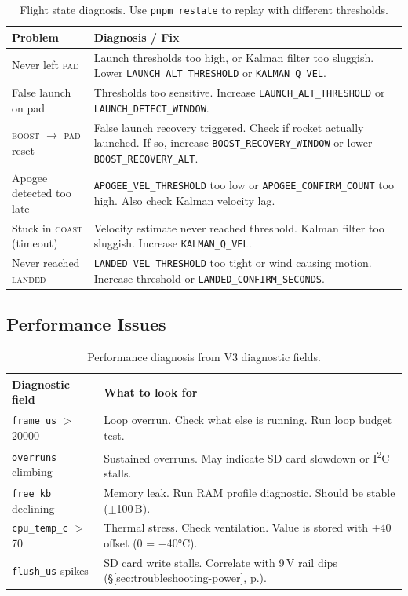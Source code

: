 \documentclass[11pt, a4paper, twoside]{article}
\newcommand{\config}[1]{\texttt{#1}}
\newcommand{\state}[1]{\textsc{#1}}
\newcommand{\xref}[1]{(\S\ref{#1}, p.\pageref{#1})}
\begin{document}
\begin{table}[ht]
\centering
\small
\caption{Flight state diagnosis. Use \texttt{pnpm restate} to replay with different thresholds.}
\label{tab:fsm-diag}
\begin{tabularx}{\textwidth}{l X}
\toprule
\textbf{Problem} & \textbf{Diagnosis / Fix} \\
\midrule
Never left \state{pad} & Launch thresholds too high, or Kalman filter too sluggish. Lower \config{LAUNCH\_ALT\_THRESHOLD} or \config{KALMAN\_Q\_VEL}. \\
False launch on pad & Thresholds too sensitive. Increase \config{LAUNCH\_ALT\_THRESHOLD} or \config{LAUNCH\_DETECT\_WINDOW}. \\
\state{boost} $\to$ \state{pad} reset & False launch recovery triggered. Check if rocket actually launched. If so, increase \config{BOOST\_RECOVERY\_WINDOW} or lower \config{BOOST\_RECOVERY\_ALT}. \\
Apogee detected too late & \config{APOGEE\_VEL\_THRESHOLD} too low or \config{APOGEE\_CONFIRM\_COUNT} too high. Also check Kalman velocity lag. \\
Stuck in \state{coast} (timeout) & Velocity estimate never reached threshold. Kalman filter too sluggish. Increase \config{KALMAN\_Q\_VEL}. \\
Never reached \state{landed} & \config{LANDED\_VEL\_THRESHOLD} too tight or wind causing motion. Increase threshold or \config{LANDED\_CONFIRM\_SECONDS}. \\
\bottomrule
\end{tabularx}
\end{table}

\subsection{Performance Issues}

\begin{table}[ht]
\centering
\small
\caption{Performance diagnosis from V3 diagnostic fields.}
\label{tab:perf-diag}
\begin{tabularx}{\textwidth}{l X}
\toprule
\textbf{Diagnostic field} & \textbf{What to look for} \\
\midrule
\texttt{frame\_us} $>$ 20000 & Loop overrun. Check what else is running. Run loop budget test. \\
\texttt{overruns} climbing & Sustained overruns. May indicate SD card slowdown or I\textsuperscript{2}C stalls. \\
\texttt{free\_kb} declining & Memory leak. Run RAM profile diagnostic. Should be stable ($\pm$100\,B). \\
\texttt{cpu\_temp\_c} $>$ 70 & Thermal stress. Check ventilation. Value is stored with $+$40 offset (0 = $-$40\si{\degreeCelsius}). \\
\texttt{flush\_us} spikes & SD card write stalls. Correlate with 9\,V rail dips \xref{sec:troubleshooting-power}. \\
\bottomrule
\end{tabularx}
\end{table}
\end{document}
